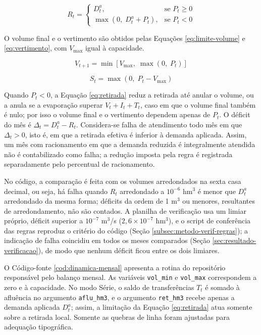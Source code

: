 \begin{equation}
    R_t =
    \begin{cases}
        D^{a}_t, & \text{se } P_t \geq 0\\
        \max\left(0,\; D^{a}_t + P_t\right), & \text{se } P_t < 0
    \end{cases}
    \label{eq:retirada}
\end{equation}

O volume final e o vertimento são obtidos pelas Equações \ref{eq:limite-volume} e \ref{eq:vertimento}, com $V_{\max}$ igual à capacidade.

\begin{equation}
    V_{t+1} = \min\left[V_{\max},\;\max\left(0,\;P_t\right)\right]
    \label{eq:limite-volume}
\end{equation}

\begin{equation}
    S_t = \max\left(0,\;P_t - V_{\max}\right)
    \label{eq:vertimento}
\end{equation}

Quando $P_t < 0$, a Equação \ref{eq:retirada} reduz a retirada até anular o volume, ou a anula se a evaporação superar $V_t + I_t + T_t$, caso em que o volume final também é nulo; por isso o volume final e o vertimento dependem apenas de $P_t$. O déficit do mês é $\Delta_t = D^{a}_t - R_t$. Considera-se falha de atendimento todo mês em que $\Delta_t > 0$, isto é, em que a retirada efetiva é inferior à demanda aplicada. Assim, um mês com racionamento em que a demanda reduzida é integralmente atendida não é contabilizado como falha; a redução imposta pela regra é registrada separadamente pelo percentual de racionamento.

No código, a comparação é feita com os volumes arredondados na sexta casa decimal, ou seja, há falha quando $R_t$ arredondado a $10^{-6}$ hm$^3$ é menor que $D^{a}_t$ arredondado da mesma forma; déficits da ordem de 1 m$^3$ ou menores, resultantes de arredondamento, não são contados. A planilha de verificação usa um limiar próprio, déficit superior a $10^{-7}$ m$^3$/s ($2{,}6 \times 10^{-7}$ hm$^3$), e o script de conferência das regras reproduz o critério do código (Seção \ref{subsec:metodo-verif-regras}); a indicação de falha coincidiu em todos os meses comparados (Seção \ref{sec:resultado-verificacao}), de modo que nenhum déficit ficou entre os dois limiares.

O Código-fonte \ref{cod:dinamica-mensal} apresenta a rotina do repositório responsável pelo balanço mensal. As variáveis \texttt{vol\_min} e \texttt{vol\_max} correspondem a zero e à capacidade. No modo Série, o saldo de transferências $T_t$ é somado à afluência no argumento \texttt{aflu\_hm3}, e o argumento \texttt{ret\_hm3} recebe apenas a demanda aplicada $D^{a}_t$; assim, a limitação da Equação \ref{eq:retirada} atua somente sobre a retirada local. Somente as quebras de linha foram ajustadas para adequação tipográfica.

